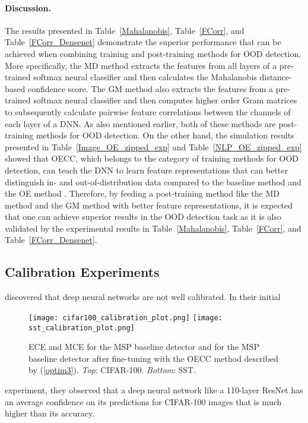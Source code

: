 \documentclass{article} \usepackage{iclr2020_conference,times}
\begin{document}
\paragraph{Discussion.}The results presented in Table~\ref{Mahalanobis}, Table~\ref{FCorr}, and Table~\ref{FCorr_Densenet} demonstrate the superior performance that can be achieved when combining training and post-training methods for OOD detection. More specifically, the MD method \citep{Lee:2018:SUF:3327757.3327819} extracts the features from all layers of a pre-trained softmax neural classifier and then calculates the Mahalanobis distance-based confidence score. The GM method \citep{ch2019detecting} also extracts the features from a pre-trained softmax neural classifier and then computes higher order Gram matrices to subsequently calculate pairwise feature correlations between the channels of each layer of a DNN. As also mentioned earlier, both of these methods are post-training methods for OOD detection. On the other hand, the simulation results presented in Table~\ref{Image_OE_zipped_exp} and Table~\ref{NLP_OE_zipped_exp} showed that OECC, which belongs to the category of training methods for OOD detection, can teach the DNN to learn feature representations that can better distinguish in- and out-of-distribution data compared to the baseline method \citep{hendrycks17baseline} and the OE method \citep{hendrycks2019oe}. Therefore, by feeding a post-training method like the MD method \citep{Lee:2018:SUF:3327757.3327819} and the GM method \citep{ch2019detecting} with better feature representations, it is expected that one can achieve superior results in the OOD detection task as it is also validated by the experimental results in Table~\ref{Mahalanobis}, Table~\ref{FCorr}, and Table~\ref{FCorr_Densenet}.


\subsection{Calibration Experiments}
\citet{Guo:2017:CMN:3305381.3305518} discovered that deep neural networks are not well
calibrated. 
In their initial
\begin{wrapfigure}{r}{0.38\textwidth}
\texttt{[image: cifar100\_calibration\_plot.png]} 
\texttt{[image: sst\_calibration\_plot.png]} 
\caption{ECE and MCE for the MSP baseline detector and for the MSP baseline detector after fine-tuning with the OECC method described by (\ref{optim3}). {\it Top}: CIFAR-100. {\it Bottom}: SST.}
\label{fig:wrapfig2}
\end{wrapfigure}
experiment, they observed that a deep neural network like a 110-layer ResNet \citep{DBLP:journals/corr/HeZRS15} has an average confidence on its predictions for CIFAR-100 images that is much higher than its accuracy. 
\end{document}
